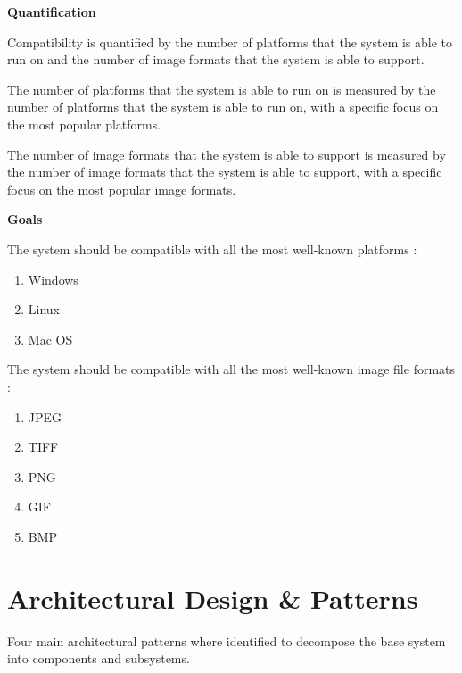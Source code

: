 \documentclass[11pt,a4paper]{article}
\begin{document}
{\bf Quantification}

Compatibility is quantified by the number of platforms that the system is able to run on and the number of image formats that the system is able to support.

The number of platforms that the system is able to run on is measured by the number of platforms that the system is able to run on, with a specific focus on the most popular platforms.

The number of image formats that the system is able to support is measured by the number of image formats that the system is able to support, with a specific focus on the most popular image formats.

{\bf Goals}

The system should be compatible with all the most well-known platforms : 
\begin{enumerate}
    \item Windows
    \item Linux
    \item Mac OS
\end{enumerate}

The system should be compatible with all the most well-known image file formats : 
\begin{enumerate}
    \item JPEG
    \item TIFF
    \item PNG
    \item GIF
    \item BMP
\end{enumerate}


\pagebreak

\section{Architectural Design \& Patterns}
Four main architectural patterns where identified to decompose the base system
into components and subsystems.
\end{document}
